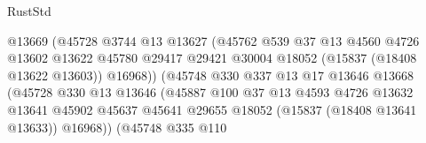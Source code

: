 \begin{lexlean}{RustStd}
\begin{coremodule}
                                          @13669
                                          (@45728
                                            @3744
                                            @13
                                            @13627
                                            (@45762
                                              @539
                                              @37
                                              @13
                                              @4560
                                              @4726
                                              @13602
                                              @13622
                                              @45780
                                              @29417
                                              @29421
                                              @30004
                                              @18052
                                              (@15837 (@18408 @13622 @13603))
                                              @16968))
                                          (@45748
                                            @330
                                            @337
                                            @13
                                            @17
                                            @13646
                                            @13668
                                            (@45728
                                              @330
                                              @13
                                              @13646
                                              (@45887
                                                @100
                                                @37
                                                @13
                                                @4593
                                                @4726
                                                @13632
                                                @13641
                                                @45902
                                                @45637
                                                @45641
                                                @29655
                                                @18052
                                                (@15837 (@18408 @13641 @13633))
                                                @16968))
                                            (@45748
                                              @335
                                              @110

\end{coremodule}
\end{lexlean}
